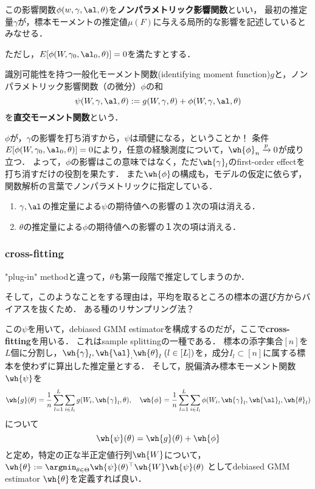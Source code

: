 \documentclass[uplatex,dvipdfmx]{jsreport}
\begin{document}
この影響関数$\phi(w,\gamma,\al,\theta)$を\textbf{ノンパラメトリック影響関数}といい，
最初の推定量$\gamma$が，標本モーメントの推定値$\mu(F)$に与える局所的な影響を記述しているとみなせる．

ただし，$E[\phi(W,\gamma_0,\al_0,\theta)]=0$を満たすとする．

\begin{definition}
    識別可能性を持つ一般化モーメント関数(identifying moment function)$g$と，ノンパラメトリック影響関数（の微分）$\phi$の和
    \[\psi(W,\gamma,\al,\theta):=g(W,\gamma,\theta)+\phi(W,\gamma,\al,\theta)\]
    を\textbf{直交モーメント関数}という．
\end{definition}
\begin{remarks}
    $\phi$が，$\gamma$の影響を打ち消すから，$\psi$は頑健になる，ということか！
    条件$E[\phi(W,\gamma_0,\al_0,\theta)]=0$により，任意の経験測度について，$\wh{\phi}_n\xrightarrow{p}0$が成り立つ．
    よって，$\phi$の影響はこの意味ではなく，ただ$\wh{\gamma}_l$のfirst-order effectを打ち消すだけの役割を果たす．
    また$\wh{\phi}$の構成も，モデルの仮定に依らず，関数解析の言葉でノンパラメトリックに指定している．
\end{remarks}

\begin{theorem}\mbox{}
    \begin{enumerate}
        \item $\gamma,\al$の推定量による$\psi$の期待値への影響の１次の項は消える．
        \item $\theta$の推定量による$\phi$の期待値への影響の１次の項は消える．
    \end{enumerate}
\end{theorem}

\subsubsection{cross-fitting}

\begin{tcolorbox}[colframe=ForestGreen, colback=ForestGreen!10!white,breakable,colbacktitle=ForestGreen!40!white,coltitle=black,fonttitle=\bfseries\sffamily,
title=]
    "plug-in" methodと違って，$\theta$も第一段階で推定してしまうのか．

    そして，このようなことをする理由は，平均を取るところの標本の選び方からバイアスを抜くため．
    ある種のリサンプリング法？
\end{tcolorbox}

この$\psi$を用いて，debiased GMM estimatorを構成するのだが，ここで\textbf{cross-fitting}を用いる．
これはsample splittingの一種である．
標本の添字集合$[n]$を$L$個に分割し，$\wh{\gamma}_l,\wh{\al}_,\wh{\theta}_l\;(l\in[L])$を，成分$I_l\subset[n]$に属する標本を使わずに算出した推定量とする．
そして，脱偏済み標本モーメント関数$\wh{\psi}$を
\[\wh{g}(\theta)=\frac{1}{n}\sum^L_{l=1}\sum_{i\in I_l}g(W_i,\wh{\gamma}_l,\theta),\quad\wh{\phi}=\frac{1}{n}\sum^L_{l=1}\sum_{i\in I_l}\phi(W_i,\wh{\gamma}_l,\wh{\al}_l,\wh{\theta}_l)\]
について
\[\wh{\psi}(\theta)=\wh{g}(\theta)+\wh{\phi}\]
と定め，特定の正な半正定値行列$\wh{W}$について，
$\wh{\theta}:=\argmin_{\theta\in\Theta}\wh{\psi}(\theta)^\top\wh{W}\wh{\psi}(\theta)$
としてdebiased GMM estimator $\wh{\theta}$を定義すれば良い．
\end{document}
